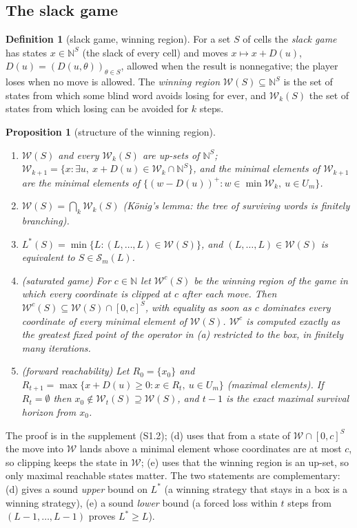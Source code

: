\documentclass[11pt,a4paper]{article}
\theoremstyle{plain}
\newtheorem{proposition}[theorem]{Proposition}
\theoremstyle{definition}
\newtheorem{definition}[theorem]{Definition}
\theoremstyle{remark}
\newcommand{\N}{\mathbb{N}}
\newcommand{\calS}{\mathcal{S}}
\newcommand{\calW}{\mathcal{W}}
\newcommand{\Lstar}{L^{\ast}}
\begin{document}
\subsection{The slack game}
\begin{definition}[slack game, winning region]\label{def:game}
For a set $S$ of cells the \emph{slack game} has states $x\in\N^S$ (the slack of every cell) and moves $x\mapsto x+D(u)$, $D(u)=(D(u,\theta))_{\theta\in S}$, allowed when the result is nonnegative; the player loses when no move is allowed. The \emph{winning region} $\calW(S)\subseteq\N^S$ is the set of states from which some blind word avoids losing for ever, and $\calW_k(S)$ the set of states from which losing can be avoided for $k$ steps.
\end{definition}

\begin{proposition}[structure of the winning region]\label{prop:game}
\begin{enumerate}[label=(\alph*),leftmargin=2.2em,itemsep=1pt]
\item $\calW(S)$ and every $\calW_k(S)$ are up-sets of $\N^S$; $\calW_{k+1}=\{x:\exists u,\ x+D(u)\in\calW_k\cap\N^S\}$, and the minimal elements of $\calW_{k+1}$ are the minimal elements of $\{(w-D(u))^+:w\in\min\calW_k,\ u\in U_m\}$.
\item $\calW(S)=\bigcap_k\calW_k(S)$ (K\"onig's lemma: the tree of surviving words is finitely branching).
\item $\Lstar(S)=\min\{L:(L,\dots,L)\in\calW(S)\}$, and $(L,\dots,L)\in\calW(S)$ is equivalent to $S\in\calS_m(L)$.
\item (saturated game) For $c\in\N$ let $\calW^{c}(S)$ be the winning region of the game in which every coordinate is clipped at $c$ after each move. Then $\calW^{c}(S)\subseteq\calW(S)\cap[0,c]^S$, with equality as soon as $c$ dominates every coordinate of every minimal element of $\calW(S)$. $\calW^{c}$ is computed exactly as the greatest fixed point of the operator in (a) restricted to the box, in finitely many iterations.
\item (forward reachability) Let $R_0=\{x_0\}$ and $R_{t+1}=\max\{x+D(u)\ge0:x\in R_t,\ u\in U_m\}$ (maximal elements). If $R_t=\emptyset$ then $x_0\notin\calW_t(S)\supseteq\calW(S)$, and $t-1$ is the exact maximal survival horizon from $x_0$.
\end{enumerate}
\end{proposition}
The proof is in the supplement (S1.2); (d) uses that from a state of $\calW\cap[0,c]^S$ the move into $\calW$ lands above a minimal element whose coordinates are at most $c$, so clipping keeps the state in $\calW$; (e) uses that the winning region is an up-set, so only maximal reachable states matter. The two statements are complementary: (d) gives a sound \emph{upper} bound on $\Lstar$ (a winning strategy that stays in a box is a winning strategy), (e) a sound \emph{lower} bound (a forced loss within $t$ steps from $(L-1,\dots,L-1)$ proves $\Lstar\ge L$).
\end{document}

